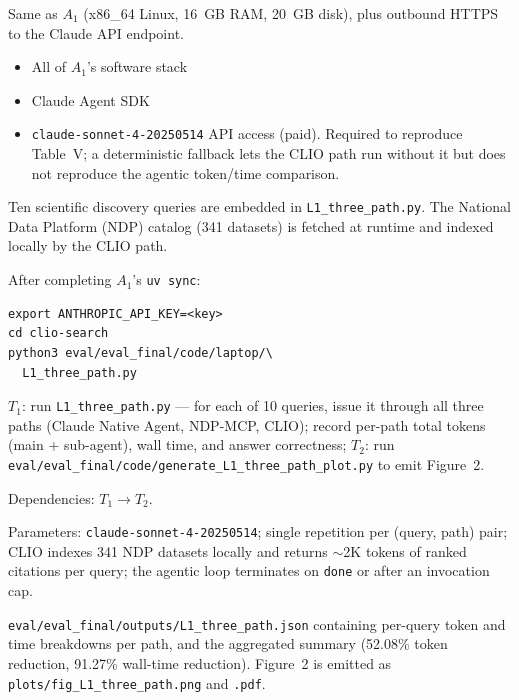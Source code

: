 \documentclass[conference]{IEEEtran}
\begin{document}

Same as $A_1$ (x86\_64 Linux, 16~GB RAM, 20~GB disk), plus outbound HTTPS to the Claude API endpoint.


\begin{itemize}
\item All of $A_1$'s software stack
\item Claude Agent SDK
\item \texttt{claude-sonnet-4-20250514} API access (paid). Required to reproduce Table~V; a deterministic fallback lets the CLIO path run without it but does not reproduce the agentic token/time comparison.
\end{itemize}


Ten scientific discovery queries are embedded in \texttt{L1\_three\_path.py}. The National Data Platform (NDP) catalog (341 datasets) is fetched at runtime and indexed locally by the CLIO path.


After completing $A_1$'s \texttt{uv sync}:
\begin{verbatim}
export ANTHROPIC_API_KEY=<key>
cd clio-search
python3 eval/eval_final/code/laptop/\
  L1_three_path.py
\end{verbatim}

\artcomp

$T_1$: run \texttt{L1\_three\_path.py} --- for each of 10 queries, issue it through all three paths (Claude Native Agent, NDP-MCP, CLIO); record per-path total tokens (main + sub-agent), wall time, and answer correctness;
$T_2$: run \texttt{eval/eval\_final/code/generate\_L1\_three\_path\_plot.py} to emit Figure~2.

Dependencies: $T_1 \rightarrow T_2$.

Parameters: \texttt{claude-sonnet-4-20250514}; single repetition per (query, path) pair; CLIO indexes 341 NDP datasets locally and returns $\sim$2K tokens of ranked citations per query; the agentic loop terminates on \texttt{done} or after an invocation cap.

\artout

\texttt{eval/eval\_final/outputs/L1\_three\_path.json} containing per-query token and time breakdowns per path, and the aggregated summary (52.08\% token reduction, 91.27\% wall-time reduction). Figure~2 is emitted as \texttt{plots/fig\_L1\_three\_path.png} and \texttt{.pdf}.
\end{document}
